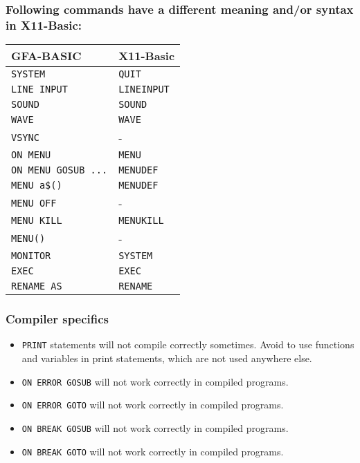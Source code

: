 \subsubsection*{Following commands have a different meaning and/or syntax in X11-Basic:}


\begin{center}\begin{tabular}{|ll|}
\hline
{\bf GFA-BASIC }        & {\bf X11-Basic}\\
\hline
\verb|SYSTEM|           & \verb|QUIT|\\
\verb|LINE INPUT|       & \verb|LINEINPUT|\\
\verb|SOUND|		& \verb|SOUND|\\
\verb|WAVE|		& \verb|WAVE|\\
\verb|VSYNC|            &  -\\
\verb|ON MENU|		& \verb|MENU|\\
\verb|ON MENU GOSUB ...|& \verb|MENUDEF|\\
\verb|MENU a$()|        & \verb|MENUDEF|\\
\verb|MENU OFF|         &  -\\
\verb|MENU KILL|        & \verb|MENUKILL|\\
\verb|MENU()|           &  -\\
\verb|MONITOR|          & \verb|SYSTEM|\\
\verb|EXEC|             & \verb|EXEC|\\
\verb|RENAME AS|        & \verb|RENAME|\\
\hline
\end{tabular}\end{center}

\subsubsection*{Compiler specifics}

\begin{itemize}
\item \verb|PRINT| statements will not compile correctly sometimes. Avoid to use functions and variables in print statements, which are not used anywhere else. 
\item \verb|ON ERROR GOSUB| will not work correctly in compiled programs.
\item \verb|ON ERROR GOTO| will not work correctly in compiled programs.
\item \verb|ON BREAK GOSUB| will not work correctly in compiled programs.
\item \verb|ON BREAK GOTO| will not work correctly in compiled programs.
\end{itemize}

